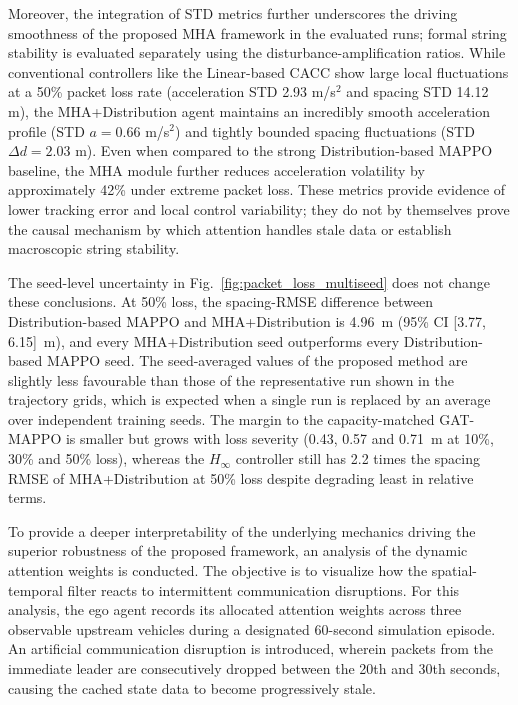 \documentclass{ieeeaccess}
\begin{document}
Moreover, the integration of STD metrics further underscores the driving smoothness of the proposed MHA framework in the evaluated runs; formal string stability is evaluated separately using the disturbance-amplification ratios. While conventional controllers like the Linear-based CACC show large local fluctuations at a 50\% packet loss rate (acceleration STD 2.93 m/s$^2$ and spacing STD 14.12 m), the MHA+Distribution agent maintains an incredibly smooth acceleration profile (STD $a = 0.66$ m/s$^2$) and tightly bounded spacing fluctuations (STD $\Delta d = 2.03$ m). Even when compared to the strong Distribution-based MAPPO baseline, the MHA module further reduces acceleration volatility by approximately 42\% under extreme packet loss. These metrics provide evidence of lower tracking error and local control variability; they do not by themselves prove the causal mechanism by which attention handles stale data or establish macroscopic string stability. %

The seed-level uncertainty in Fig.~\ref{fig:packet_loss_multiseed} does not change these conclusions. At 50\% loss, the spacing-RMSE difference between Distribution-based MAPPO and MHA+Distribution is 4.96~m (95\% CI [3.77, 6.15]~m), and every MHA+Distribution seed outperforms every Distribution-based MAPPO seed. The seed-averaged values of the proposed method are slightly less favourable than those of the representative run shown in the trajectory grids, which is expected when a single run is replaced by an average over independent training seeds. The margin to the capacity-matched GAT-MAPPO is smaller but grows with loss severity (0.43, 0.57 and 0.71~m at 10\%, 30\% and 50\% loss), whereas the $H_\infty$ controller still has 2.2 times the spacing RMSE of MHA+Distribution at 50\% loss despite degrading least in relative terms. %

To provide a deeper interpretability of the underlying mechanics driving the superior robustness of the proposed framework, an analysis of the dynamic attention weights is conducted. The objective is to visualize how the spatial-temporal filter reacts to intermittent communication disruptions. For this analysis, the ego agent records its allocated attention weights across three observable upstream vehicles during a designated 60-second simulation episode. An artificial communication disruption is introduced, wherein packets from the immediate leader are consecutively dropped between the 20th and 30th seconds, causing the cached state data to become progressively stale.
\end{document}
